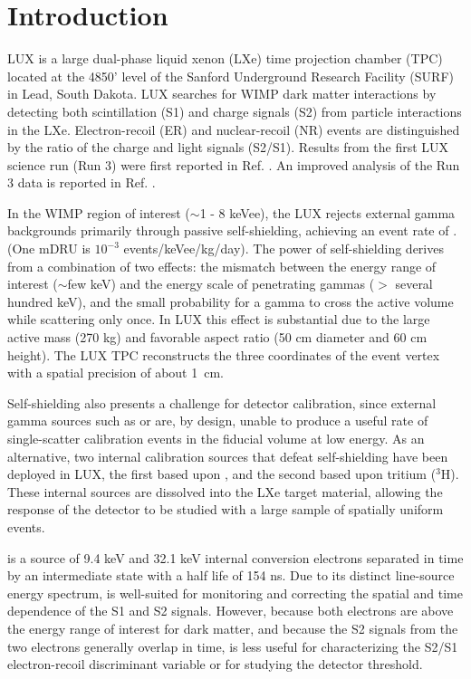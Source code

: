 \section{Introduction}

LUX is a large dual-phase liquid xenon (LXe) time projection chamber (TPC) located at the 4850' level of the Sanford Underground Research Facility (SURF) in Lead, South Dakota. LUX searches for WIMP dark matter interactions by detecting both scintillation (S1) and charge signals (S2) from particle interactions in the LXe. Electron-recoil (ER) and nuclear-recoil (NR) events are distinguished by the ratio of the charge and light signals (S2/S1). Results from the first LUX science run (Run 3) were first reported in Ref. \cite{LUX_PRL}. An improved analysis of the Run 3 data is reported in Ref. \cite{lux-reanalysis}.

In the WIMP region of interest ($\sim$1 - 8 keVee), the LUX rejects external gamma backgrounds primarily through passive self-shielding, achieving an event rate of . (One mDRU is $10^{-3}$ events/keVee/kg/day). The power of self-shielding derives from a combination of two effects: the mismatch between the energy range of interest ($\sim$few keV) and the energy scale of penetrating gammas ($>$  several hundred keV), and the small probability for a gamma to cross the active volume while scattering only once. In LUX this effect is substantial due to the large active mass (270 kg) and favorable aspect ratio (50 cm diameter and 60 cm height). The LUX TPC reconstructs the three coordinates of the event vertex with a spatial precision of about 1~cm. 

Self-shielding also presents a challenge for detector calibration, since external gamma sources such as \cssrc or \thsrc are, by design, unable to produce a useful rate of single-scatter calibration events in the fiducial volume at low energy. As an alternative, two internal calibration sources that defeat self-shielding have been deployed in LUX, the first based upon \krsrc\cite{Kastens:2009rt, baudis}, and the second based upon tritium ($^{3}$H). These internal sources are dissolved into the LXe target material, allowing the response of the detector to be studied with a large sample of spatially uniform events.

\krsrc is a source of 9.4 keV and 32.1 keV internal conversion electrons separated in time by an intermediate state with a half life of 154 ns\cite{83Kr_HalfLife_1}\cite{83Kr_HalfLife_2}.  Due to its distinct line-source energy spectrum, \krsrc is well-suited for monitoring and correcting the spatial and time dependence of the S1 and S2 signals. However, because both \krsrc electrons are above the energy range of interest for dark matter, and because the S2 signals from the two electrons generally overlap in time,  \krsrc is less useful for characterizing the S2/S1 electron-recoil discriminant variable or for studying the detector threshold.

